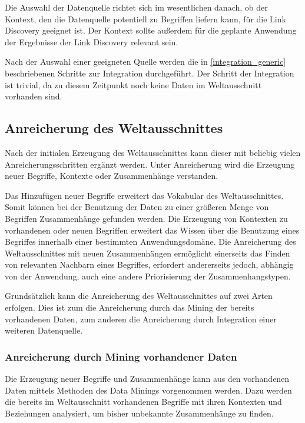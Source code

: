 Die Auswahl der Datenquelle richtet sich im wesentlichen danach, ob der Kontext, den die Datenquelle potentiell zu Begriffen liefern kann, für die Link Discovery geeignet ist. Der Kontext sollte außerdem für die geplante Anwendung der Ergebnisse der Link Discovery relevant sein.

Nach der Auswahl einer geeigneten Quelle werden die in \cref{integration_generic} beschriebenen Schritte zur Integration durchgeführt. Der Schritt der Integration ist trivial, da zu diesem Zeitpunkt noch keine Daten im Weltausschnitt vorhanden sind.

\subsection{Anreicherung des Weltausschnittes}

Nach der initialen Erzeugung des Weltausschnittes kann dieser mit beliebig vielen Anreicherungsschritten ergänzt werden. Unter Anreicherung wird die Erzeugung neuer Begriffe, Kontexte oder Zusammenhänge verstanden.

Das Hinzufügen neuer Begriffe erweitert das Vokabular des Weltausschnittes. Somit können bei der Benutzung der Daten zu einer größeren Menge von Begriffen Zusammenhänge gefunden werden. Die Erzeugung von Kontexten zu vorhandenen oder neuen Begriffen erweitert das Wissen über die Benutzung eines Begriffes innerhalb einer bestimmten Anwendungsdomäne. Die Anreicherung des Weltausschnittes mit neuen Zusammenhängen ermöglicht einerseits das Finden von relevanten Nachbarn eines Begriffes, erfordert andererseits jedoch, abhängig von der Anwendung, auch eine andere Priorisierung der Zusammenhangstypen.

Grundsätzlich kann die Anreicherung des Weltausschnittes auf zwei Arten erfolgen. Dies ist zum die Anreicherung durch das Mining der bereits vorhandenen Daten, zum anderen die Anreicherung durch Integration einer weiteren Datenquelle.

\subsubsection{Anreicherung durch Mining vorhandener Daten}
\label{enrichment_mining}

Die Erzeugung neuer Begriffe und Zusammenhänge kann aus den vorhandenen Daten mittels Methoden des Data Minings vorgenommen werden. Dazu werden die bereits im Weltausschnitt vorhandenen Begriffe mit ihren Kontexten und Beziehungen analysiert, um bisher unbekannte Zusammenhänge zu finden.

